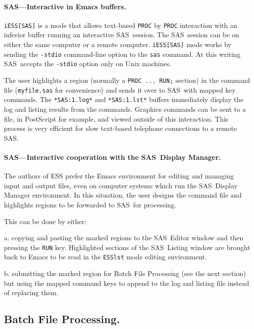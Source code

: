 \documentclass{article}
\newcommand*{\SAS}{\textsc{SAS}}
\newcommand{\stexttt}[1]{{\small\texttt{#1}}}
\begin{document}
\paragraph{\SAS---Interactive in Emacs buffers.}

\stexttt{iESS[SAS]} is a mode that allows text-based \stexttt{PROC} by
\stexttt{PROC} interaction with an inferior buffer running an
interactive \SAS\ session.  The \SAS\ session can be on either the
same computer or a remote computer.  \stexttt{iESS[SAS]} mode works by
sending the \stexttt{-stdio} command-line option to the \stexttt{sas}
command.  At this writing \SAS\ accepts the \stexttt{-stdio} option
only on Unix machines.

The user highlights a region (normally a \stexttt{PROC ... RUN;}
section) in the command file (\stexttt{myfile.sas} for convenience)
and sends it over to \SAS\ with mapped key commands.  The
\stexttt{*SAS:1.log*} and \stexttt{*SAS:1.lst*} buffers immediately
display the log and listing results from the commands.
Graphics commands can be sent to a file, in PostScript for example,
and viewed outside of this interaction.  This process is very efficient
for slow text-based telephone connections to a remote \SAS.


\paragraph{\SAS---Interactive cooperation with the \SAS\ Display Manager.}

The authors of ESS prefer the Emacs environment for editing and
managing input and output files, even on computer systems which run
the \SAS\ Display Manager environment.  In this situation, the user
designs the command file
and highlights regions to be forwarded to \SAS\ for processing.

This can be done by either:

a. copying and pasting the marked regions to
the \SAS\ Editor window and then pressing the \stexttt{RUN} key.
Highlighted sections of the \SAS\ Listing window are brought back
to Emacs to be read in the \stexttt{ESSlst} mode editing environment.

b. submitting the marked region for Batch File Processing (see the next
section) but using the mapped command keys to append to the log and listing
file instead of replacing them.

\subsection{Batch File Processing.}
\label{sec:batch-file}
\end{document}
